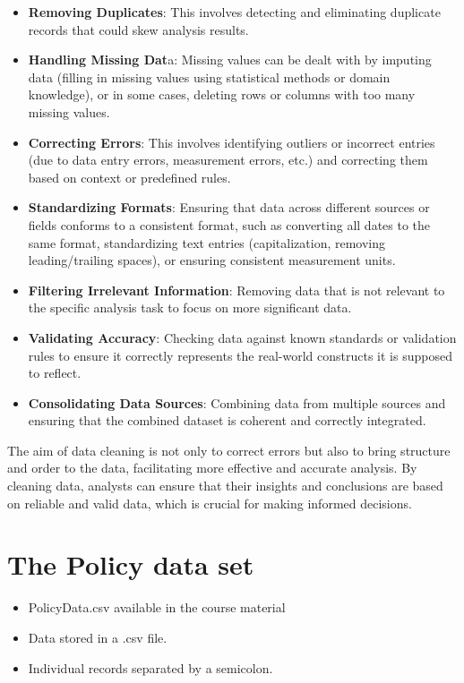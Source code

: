 \documentclass[
]{book}
\providecommand{\tightlist}{%
  \setlength{\itemsep}{0pt}\setlength{\parskip}{0pt}}
\begin{document}
\begin{itemize}
\item
  \textbf{Removing Duplicates}: This involves detecting and eliminating
  duplicate records that could skew analysis results.
\item
  \textbf{Handling Missing Dat}a: Missing values can be dealt with by
  imputing data (filling in missing values using statistical methods
  or domain knowledge), or in some cases, deleting rows or columns
  with too many missing values.
\item
  \textbf{Correcting Errors}: This involves identifying outliers or
  incorrect entries (due to data entry errors, measurement errors,
  etc.) and correcting them based on context or predefined rules.
\item
  \textbf{Standardizing Formats}: Ensuring that data across different
  sources or fields conforms to a consistent format, such as
  converting all dates to the same format, standardizing text entries
  (capitalization, removing leading/trailing spaces), or ensuring
  consistent measurement units.
\item
  \textbf{Filtering Irrelevant Information}: Removing data that is not
  relevant to the specific analysis task to focus on more significant
  data.
\item
  \textbf{Validating Accuracy}: Checking data against known standards or
  validation rules to ensure it correctly represents the real-world
  constructs it is supposed to reflect.
\item
  \textbf{Consolidating Data Sources}: Combining data from multiple sources
  and ensuring that the combined dataset is coherent and correctly
  integrated.
\end{itemize}

The aim of data cleaning is not only to correct errors but also to bring
structure and order to the data, facilitating more effective and
accurate analysis. By cleaning data, analysts can ensure that their
insights and conclusions are based on reliable and valid data, which is
crucial for making informed decisions.

\section*{The Policy data set}\label{the-policy-data-set}

\begin{itemize}
\tightlist
\item
  PolicyData.csv available in the course material
\item
  Data stored in a .csv file.
\item
  Individual records separated by a semicolon.
\end{itemize}
\end{document}
